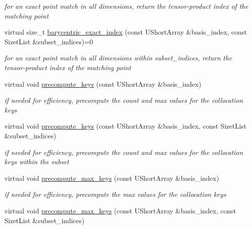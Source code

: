 \begin{DoxyCompactItemize}
\begin{DoxyCompactList}\small\item\em for an exact point match in all dimensions, return the tensor-\/product index of the matching point \end{DoxyCompactList}\item 
virtual size\+\_\+t \hyperlink{classPecos_1_1SharedInterpPolyApproxData_a4fbb23a77904175ba41f2b1227d0fb48}{barycentric\+\_\+exact\+\_\+index} (const U\+Short\+Array \&basis\+\_\+index, const Sizet\+List \&subset\+\_\+indices)=0\label{classPecos_1_1SharedInterpPolyApproxData_a4fbb23a77904175ba41f2b1227d0fb48}

\begin{DoxyCompactList}\small\item\em for an exact point match in all dimensions within subset\+\_\+indices, return the tensor-\/product index of the matching point \end{DoxyCompactList}\item 
virtual void \hyperlink{classPecos_1_1SharedInterpPolyApproxData_af3fdba189ef1be4278ed198f21621ebb}{precompute\+\_\+keys} (const U\+Short\+Array \&basis\+\_\+index)
\begin{DoxyCompactList}\small\item\em if needed for efficiency, precompute the count and max values for the collocation keys \end{DoxyCompactList}\item 
virtual void \hyperlink{classPecos_1_1SharedInterpPolyApproxData_a8a006b2611ce5fa80285ff6c3dad67c0}{precompute\+\_\+keys} (const U\+Short\+Array \&basis\+\_\+index, const Sizet\+List \&subset\+\_\+indices)
\begin{DoxyCompactList}\small\item\em if needed for efficiency, precompute the count and max values for the collocation keys within the subset \end{DoxyCompactList}\item 
virtual void \hyperlink{classPecos_1_1SharedInterpPolyApproxData_a01d4893d40fc53f6193cef94658443a9}{precompute\+\_\+max\+\_\+keys} (const U\+Short\+Array \&basis\+\_\+index)
\begin{DoxyCompactList}\small\item\em if needed for efficiency, precompute the max values for the collocation keys \end{DoxyCompactList}\item 
virtual void \hyperlink{classPecos_1_1SharedInterpPolyApproxData_affd9fbab13d20744790f0b5267e4eceb}{precompute\+\_\+max\+\_\+keys} (const U\+Short\+Array \&basis\+\_\+index, const Sizet\+List \&subset\+\_\+indices)

\end{DoxyCompactItemize}
